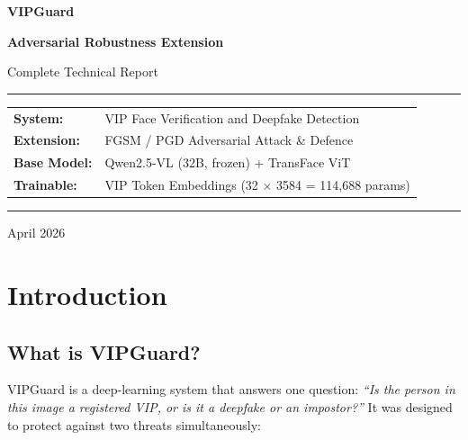 \documentclass[12pt,a4paper]{article}
\begin{document}
\begin{titlepage}
\centering
\vspace*{2cm}
{\Huge\bfseries\color{deepblue} VIPGuard}\par
\vspace{0.4cm}
{\Large\bfseries Adversarial Robustness Extension}\par
\vspace{0.4cm}
{\large Complete Technical Report}\par
\vspace{2cm}
\rule{0.8\linewidth}{0.5pt}\par
\vspace{0.5cm}
{\large
\begin{tabular}{ll}
\textbf{System:}  & VIP Face Verification and Deepfake Detection \\
\textbf{Extension:} & FGSM / PGD Adversarial Attack \& Defence \\
\textbf{Base Model:} & Qwen2.5-VL (32B, frozen) + TransFace ViT \\
\textbf{Trainable:} & VIP Token Embeddings (32 $\times$ 3584 = 114,688 params) \\
\end{tabular}
}\par
\vspace{0.5cm}
\rule{0.8\linewidth}{0.5pt}\par
\vspace{2cm}
{\large April 2026}\par
\vfill
\end{titlepage}

\tableofcontents
\newpage

\section{Introduction}

\subsection{What is VIPGuard?}

VIPGuard is a deep-learning system that answers one question: \textit{``Is the person in this image a registered VIP, or is it a deepfake or an impostor?''} It was designed to protect against two threats simultaneously:
\end{document}
